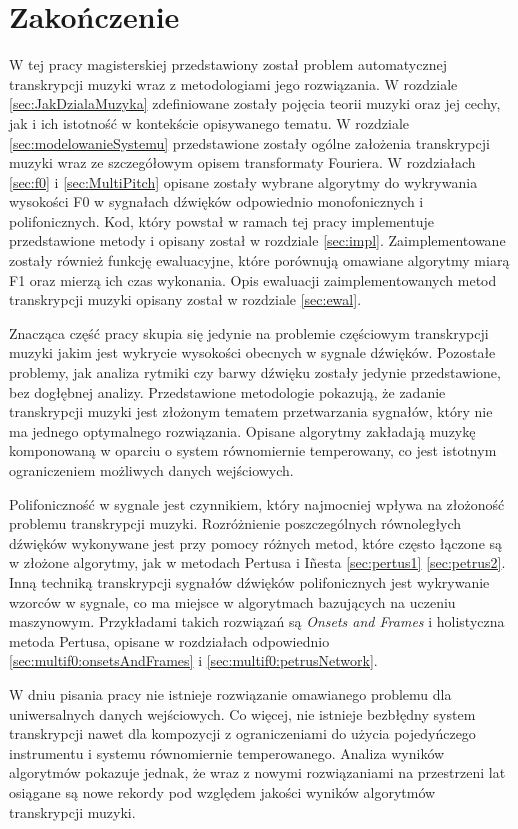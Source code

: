 \documentclass[12pt,a4paper,twoside]{mwart}
\begin{document}
\clearpage

\setcounter{secnumdepth}{0}
\section{Zakończenie} \label{sec:end}
W tej pracy magisterskiej przedstawiony został problem automatycznej transkrypcji muzyki wraz z metodologiami jego rozwiązania. W rozdziale \ref{sec:JakDzialaMuzyka} zdefiniowane zostały pojęcia teorii muzyki oraz jej cechy, jak i ich istotność w kontekście opisywanego tematu. W rozdziale \ref{sec:modelowanieSystemu} przedstawione zostały ogólne założenia transkrypcji muzyki wraz ze szczegółowym opisem transformaty Fouriera. W rozdziałach \ref{sec:f0} i \ref{sec:MultiPitch} opisane zostały wybrane algorytmy do wykrywania wysokości F0 w sygnałach dźwięków odpowiednio monofonicznych i polifonicznych. Kod, który powstał w ramach tej pracy implementuje przedstawione metody i opisany został w rozdziale \ref{sec:impl}. Zaimplementowane zostały również funkcję ewaluacyjne, które porównują omawiane algorytmy miarą F1 oraz mierzą ich czas wykonania. Opis ewaluacji zaimplementowanych metod transkrypcji muzyki opisany został w rozdziale \ref{sec:ewal}.

Znacząca część pracy skupia się jedynie na problemie częściowym transkrypcji muzyki jakim jest wykrycie wysokości obecnych w sygnale dźwięków. Pozostałe problemy, jak analiza rytmiki czy barwy dźwięku zostały jedynie przedstawione, bez dogłębnej analizy. Przedstawione metodologie pokazują, że zadanie transkrypcji muzyki jest złożonym tematem przetwarzania sygnałów, który nie ma jednego optymalnego rozwiązania. Opisane algorytmy zakładają muzykę komponowaną w oparciu o system równomiernie temperowany, co jest istotnym ograniczeniem możliwych danych wejściowych.

Polifoniczność w sygnale jest czynnikiem, który najmocniej wpływa na złożoność problemu transkrypcji muzyki. Rozróżnienie poszczególnych równoległych dźwięków wykonywane jest przy pomocy różnych metod, które często łączone są w złożone algorytmy, jak w metodach Pertusa i Iñesta \ref{sec:pertus1} \ref{sec:petrus2}. Inną techniką transkrypcji sygnałów dźwięków polifonicznych jest wykrywanie wzorców w sygnale, co ma miejsce w algorytmach bazujących na uczeniu maszynowym. Przykładami takich rozwiązań są \textit{Onsets and Frames} i holistyczna metoda Pertusa, opisane w rozdziałach odpowiednio \ref{sec:multif0:onsetsAndFrames} i \ref{sec:multif0:petrusNetwork}.

W dniu pisania pracy nie istnieje rozwiązanie omawianego problemu dla uniwersalnych danych wejściowych. Co więcej, nie istnieje bezbłędny system transkrypcji nawet dla kompozycji z ograniczeniami do użycia pojedyńczego instrumentu i systemu równomiernie temperowanego. Analiza wyników algorytmów pokazuje jednak, że wraz z nowymi rozwiązaniami na przestrzeni lat osiągane są nowe rekordy pod względem jakości wyników algorytmów transkrypcji muzyki.
\end{document}
